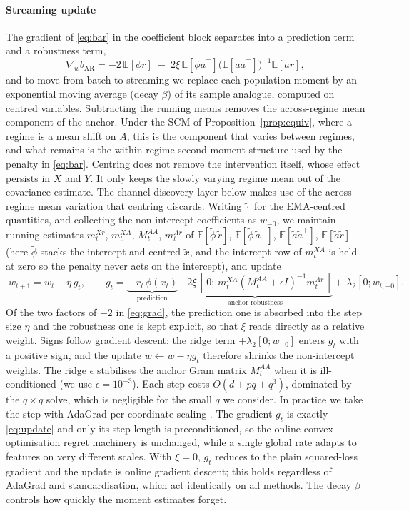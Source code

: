 \documentclass[authoryear,preprint,12pt]{elsarticle}
\theoremstyle{plain}
\theoremstyle{remark}
\newcommand{\E}{\mathbb{E}}
\begin{document}
\paragraph{Streaming update}
The gradient of \eqref{eq:bar} in the coefficient block separates into a prediction
term and a robustness term,
\begin{equation}\label{eq:grad}
\nabla_w b_{\mathrm{AR}} = -2\,\E[\phi r]
 \;-\;2\xi\,\E[\phi a^\top]\big(\E[aa^\top]\big)^{-1}\E[a r],
\end{equation}
and to move from batch to streaming we replace each population moment by an exponential
moving average (decay $\beta$) of its sample analogue, computed on centred variables.
Subtracting the running means removes the across-regime mean component of the anchor.
Under the SCM of Proposition~\ref{prop:equiv}, where a regime is a mean shift on $A$,
this is the component that varies between regimes, and what remains is the
within-regime second-moment structure used by the penalty in \eqref{eq:bar}.
Centring does not remove the intervention itself, whose effect persists in $X$ and
$Y$. It only keeps the slowly varying regime mean out of the covariance estimate. The
channel-discovery layer below makes use of the across-regime mean variation that
centring discards. Writing $\tilde\cdot$ for the EMA-centred quantities, and
collecting the non-intercept coefficients as $w_{-0}$, we maintain running estimates
$m^{Xr}_t$, $m^{XA}_t$, $M^{AA}_t$, $m^{Ar}_t$ of
$\E[\tilde\phi\,\tilde r]$, $\E[\tilde\phi\,\tilde a^\top]$,
$\E[\tilde a\tilde a^\top]$, $\E[\tilde a\tilde r]$ (here $\tilde\phi$ stacks the
intercept and centred $\tilde x$, and the intercept row of $m^{XA}_t$ is held at
zero so the penalty never acts on the intercept), and update
\begin{equation}\label{eq:update}
\boxed{\;w_{t+1}=w_t-\eta\,g_t,\qquad
 g_t=\underbrace{-\,r_t\,\phi(x_t)}_{\text{prediction}}
 \underbrace{-\,2\xi\,[\,0;\,m^{XA}_t(M^{AA}_t+\epsilon I)^{-1}m^{Ar}_t\,]}_{\text{anchor robustness}}
 +\,\lambda_2[0;w_{t,-0}].\;}
\end{equation}
Of the two factors of $-2$ in \eqref{eq:grad}, the prediction one is absorbed into
the step size $\eta$ and the robustness one is kept explicit, so that $\xi$ reads
directly as a relative weight. Signs follow gradient descent: the ridge term
$+\lambda_2[0;w_{-0}]$ enters $g_t$ with a positive sign, and the update
$w\!\leftarrow\!w-\eta g_t$ therefore shrinks the non-intercept weights. The ridge
$\epsilon$ stabilises the anchor Gram matrix $M^{AA}_t$ when it is ill-conditioned (we
use $\epsilon=10^{-3}$). Each step costs $O(d+pq+q^3)$, dominated by the $q\times q$
solve, which is negligible for the small $q$ we consider. In practice we take the step
with AdaGrad per-coordinate scaling \citep{duchi2011adagrad}. The gradient $g_t$ is
exactly \eqref{eq:update} and only its step length is preconditioned, so the
online-convex-optimisation regret machinery is unchanged, while a single global rate
adapts to features on very different scales. With $\xi=0$, $g_t$ reduces to the plain
squared-loss gradient and the update is online gradient descent; this holds
regardless of AdaGrad and standardisation, which act identically on all methods. The
decay $\beta$ controls how quickly the moment estimates forget.
\end{document}
